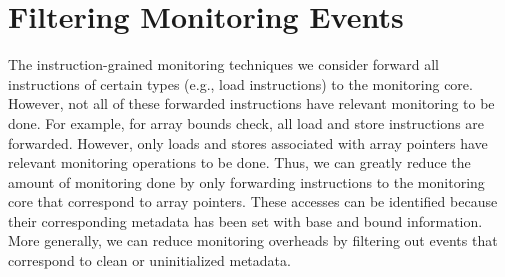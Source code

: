 \section{Filtering Monitoring Events}
\label{sec:filter}

The instruction-grained monitoring techniques we consider forward all
instructions of certain types (e.g., load instructions) to the monitoring core.
However, not all of these forwarded instructions have relevant monitoring to be
done. For example, for array bounds check, all load and store instructions are
forwarded. However, only loads and stores associated with array pointers have
relevant monitoring operations to be done. Thus, we can greatly reduce the amount of
monitoring done by only forwarding instructions to the monitoring core that 
correspond to array pointers. These accesses can be identified because their
corresponding metadata has been set with base and bound information.
More generally, we can reduce monitoring overheads by filtering out 
events that correspond to clean or uninitialized metadata.

